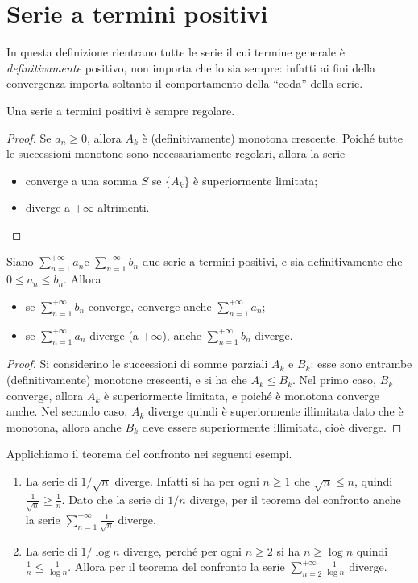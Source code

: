 \section{Serie a termini positivi}
In questa definizione rientrano tutte le serie il cui termine generale è \emph{definitivamente} positivo, non importa che lo sia sempre: infatti ai fini della convergenza importa soltanto il comportamento della ``coda'' della serie.
\begin{teorema}
Una serie a termini positivi è sempre regolare.
\end{teorema}
\begin{proof}
Se $a_n\geq 0$, allora $A_k$ è (definitivamente) monotona crescente. Poiché tutte le successioni monotone sono necessariamente regolari, allora la serie
\begin{itemize}
\item converge a una somma $S$ se $\{A_k\}$ è superiormente limitata;
\item diverge a $+\infty$ altrimenti.\qedhere
\end{itemize}
\end{proof}
\begin{teorema}
\label{t:confronto_serie}
Siano $\sum_{n=1}^{+\infty}a_n$e $\sum_{n=1}^{+\infty}b_n$ due serie a termini positivi, e sia definitivamente che $0\leq a_n\leq b_n$. Allora
\begin{itemize}
\item se $\sum_{n=1}^{+\infty}b_n$ converge, converge anche $\sum_{n=1}^{+\infty}a_n$;
\item se $\sum_{n=1}^{+\infty}a_n$ diverge (a $+\infty$), anche $\sum_{n=1}^{+\infty}b_n$ diverge.
\end{itemize}
\end{teorema}
\begin{proof}
Si considerino le successioni di somme parziali $A_k$ e $B_k$: esse sono entrambe (definitivamente) monotone crescenti, e si ha che $A_k\leq B_k$. Nel primo caso, $B_k$ converge, allora $A_k$ è superiormente limitata, e poiché è monotona converge anche.
Nel secondo caso, $A_k$ diverge quindi è superiormente illimitata dato che è monotona, allora anche $B_k$ deve essere superiormente illimitata, cioè diverge.
\end{proof}
\begin{esempio} \label{es:serie-confronto}
	Applichiamo il teorema del confronto nei seguenti esempi.
	\begin{enumerate}
		\item La serie di $1/\sqrt{n}$ diverge. Infatti si ha per ogni $n\geq 1$ che $\sqrt{n}\leq n$, quindi $\frac1{\sqrt{n}}\geq\frac1{n}$. Dato che la serie di $1/n$ diverge, per il teorema del confronto anche la serie $\sum_{n=1}^{+\infty}\frac1{\sqrt{n}}$ diverge.
		\item La serie di $1/\log n$ diverge, perché per ogni $n\geq 2$ si ha $n\geq\log n$ quindi $\frac1{n}\leq\frac1{\log n}$. Allora per il teorema del confronto la serie $\sum_{n=2}^{+\infty}\frac1{\log n}$ diverge.
	\end{enumerate}
\end{esempio}
